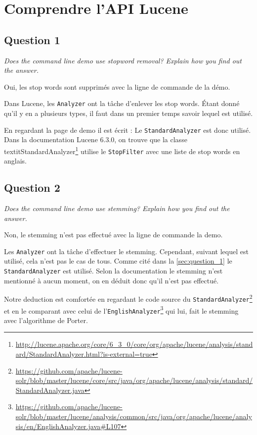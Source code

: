 \chapter{Comprendre l'API Lucene}

\section{Question 1}
\label{sec:question_1}
\textit{Does the command line demo use stopword removal? Explain how you find out the answer.}

Oui, les stop words sont supprimés avec la ligne de commande de la démo.

Dans Lucene, les \texttt{Analyzer} ont la tâche d'enlever les stop words. Étant donné qu'il y en a plusieurs types, il faut dans un premier temps savoir lequel est utilisé. 

En regardant la page de demo il est écrit :  
Le \texttt{StandardAnalyzer} est donc utilisé. Dans la documentation Lucene 6.3.0, on trouve que la classe textit{StandardAnalyzer}\footnote{\url{http://lucene.apache.org/core/6_3_0/core/org/apache/lucene/analysis/standard/StandardAnalyzer.html?is-external=true}} utilise le \texttt{StopFilter} avec une liste de stop words en anglais.

\section{Question 2}
\textit{Does the command line demo use stemming? Explain how you find out the answer.}

Non, le stemming n'est pas effectué avec la ligne de commande la demo.

Les \texttt{Analyzer} ont la tâche d'effectuer le stemming. Cependant, suivant lequel est utilisé, cela n'est pas le cas de tous. Comme cité dans la \autoref{sec:question_1} le \texttt{StandardAnalyzer} est utilisé. Selon la documentation le stemming n'est mentionné à aucun moment, on en déduit donc qu'il n'est pas effectué.

Notre deduction est comfortée en regardant le code source du \texttt{StandardAnalyzer}\footnote{\url{https://github.com/apache/lucene-solr/blob/master/lucene/core/src/java/org/apache/lucene/analysis/standard/StandardAnalyzer.java}} et en le comparant avec celui de l'\texttt{EnglishAnalyzer}\footnote{\url{https://github.com/apache/lucene-solr/blob/master/lucene/analysis/common/src/java/org/apache/lucene/analysis/en/EnglishAnalyzer.java#L107}} qui lui, fait le stemming avec l'algorithme de Porter.

